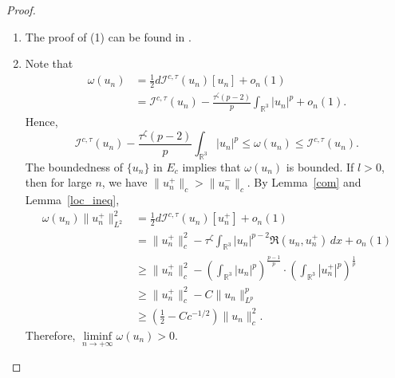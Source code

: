 \documentclass{amsart}
\theoremstyle{plain}
\theoremstyle{definition}
\theoremstyle{remark}
\numberwithin{equation}{section} \numberwithin{figure}{section}
\begin{document}
    \begin{proof}
    \begin{enumerate}
      \item[(1)] The proof of (1) can be found in \cite[Proposition 3.2]{CDGW24}.
    
      \item[(2)] Note that
            \[
            \begin{split}
              \omega(u_n) &= \frac{1}{2} d\mathcal{I}^{c,\tau}(u_n)[u_n] + o_n(1) \\
                          &= \mathcal{I}^{c,\tau}(u_n) - \frac{\tau^{\zeta}(p - 2)}{p} \int_{\mathbb{R}^3} |u_n|^p + o_n(1).
            \end{split}
            \]
            Hence,
            \[
            \mathcal{I}^{c,\tau}(u_n) - \frac{\tau^{\zeta}(p - 2)}{p} \int_{\mathbb{R}^3} |u_n|^p \leq \omega(u_n) \leq \mathcal{I}^{c,\tau}(u_n).
            \]
            The boundedness of \( \{u_n\} \) in \( E_c \) implies that \( \omega(u_n) \) is bounded. If \( l > 0 \), then for large \( n \), we have \( \|u_n^+\|_c > \|u_n^-\|_c \). By Lemma~\ref{com} and Lemma~\ref{loc_ineq},
            \[
            \begin{split}
              \omega(u_n) \|u_n^+\|_{L^2}^2 
              &= \frac{1}{2} d\mathcal{I}^{c,\tau}(u_n)[u_n^+] + o_n(1) \\
              &= \|u_n^+\|_c^2 - \tau^{\zeta} \int_{\mathbb{R}^3} |u_n|^{p-2} \Re(u_n, u_n^+) \, dx + o_n(1) \\
              &\geq \|u_n^+\|_c^2 - \left( \int_{\mathbb{R}^3} |u_n|^p \right)^{\frac{p-1}{p}} \cdot \left( \int_{\mathbb{R}^3} |u_n^+|^p \right)^{\frac{1}{p}} \\
              &\geq \|u_n^+\|_c^2 - C \|u_n\|_{L^p}^p \\
              &\geq \left( \frac{1}{2} - C c^{-1/2} \right) \|u_n\|_c^2.
            \end{split}
            \]
            Therefore, \( \liminf\limits_{n \to +\infty} \omega(u_n) > 0 \).
    

\end{enumerate}
\end{proof}
\end{document}
